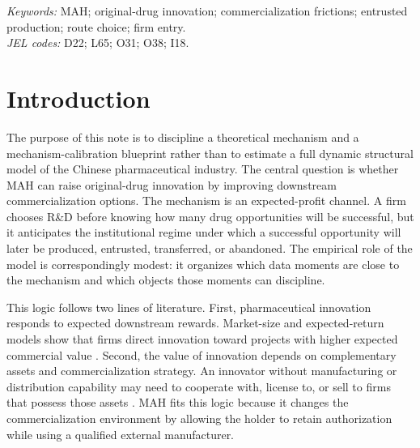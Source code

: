 \documentclass[12pt]{article}
\newcommand{\1}{\mathbf{1}}
\begin{document}
\noindent\textit{Keywords:} MAH; original-drug innovation; commercialization frictions; entrusted production; route choice; firm entry.\\
\noindent\textit{JEL codes:} D22; L65; O31; O38; I18.

\newpage
\tableofcontents
\newpage

\section{Introduction}

The purpose of this note is to discipline a theoretical mechanism and a mechanism-calibration blueprint rather than to estimate a full dynamic structural model of the Chinese pharmaceutical industry. The central question is whether MAH can raise original-drug innovation by improving downstream commercialization options. The mechanism is an expected-profit channel. A firm chooses R\&D before knowing how many drug opportunities will be successful, but it anticipates the institutional regime under which a successful opportunity will later be produced, entrusted, transferred, or abandoned. The empirical role of the model is correspondingly modest: it organizes which data moments are close to the mechanism and which objects those moments can discipline.

This logic follows two lines of literature. First, pharmaceutical innovation responds to expected downstream rewards. Market-size and expected-return models show that firms direct innovation toward projects with higher expected commercial value \citep{Schmookler1966,AcemogluLinn2004,Finkelstein2004,BlumeKohoutSood2013,DuboisDeMouzonScottMortonSeabright2015,BudishRoinWilliams2015,DranoveGarthwaiteHermosilla2014}. Second, the value of innovation depends on complementary assets and commercialization strategy. An innovator without manufacturing or distribution capability may need to cooperate with, license to, or sell to firms that possess those assets \citep{Teece1986,AroraFosfuriGambardella2001,GansStern2003}. MAH fits this logic because it changes the commercialization environment by allowing the holder to retain authorization while using a qualified external manufacturer.
\end{document}

